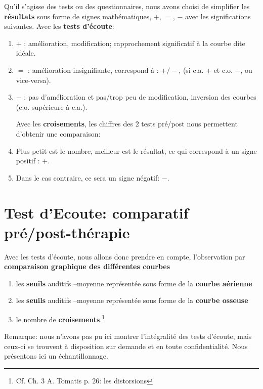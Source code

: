 Qu'il s'agisse des tests ou des questionnaires, nous avons choisi de
simplifier les \textbf{résultats} sous forme de signes
mathématiques, $+$, $=$, $-$ avec les significations suivantes.
Avec les \textbf{tests d'écoute}:
\begin{enumerate}
\item$+$   : amélioration, modification;  rapprochement significatif à la courbe dite idéale.
\item$=$   : amélioration insignifiante, correspond à : $+/-$, (si c.a. $ + $ et c.o. $-$, ou vice-versa).

\item$-$   : pas d'amélioration et pas/trop peu  de modification, inversion
des courbes (c.o. supérieure à c.a.).

  Avec les \textbf{croisements}, les chiffres des 2 tests pré/post
  nous permettent d'obtenir une comparaison:
  \item Plus petit est le nombre, meilleur est le résultat, ce qui correspond à un signe positif : $+$.
\item Dans le
  cas contraire, ce sera un signe négatif: $-$.

\end{enumerate}


 \section{Test d'Ecoute: comparatif pré/post-thérapie }
Avec les tests d'écoute, nous
allons donc prendre en compte, l'observation par \textbf{comparaison graphique des différentes
  courbes}

\begin{enumerate}
 \item   les \textbf{seuils} auditifs --moyenne
représentée sous forme de la  \textbf{courbe aérienne}
\item   les \textbf{seuils} auditifs --moyenne
représentée sous forme de la \textbf{courbe osseuse}
\item le nombre de
\textbf{croisements}.\footnote{Cf. Ch. 3 A. Tomatis p. 26: les distorsions}

\end{enumerate}


Remarque: nous n'avons pas pu ici montrer l'intégralité des tests d'écoute, mais ceux-ci se trouvent à disposition sur demande et en toute confidentialité.
Nous présentons ici un échantillonnage.


